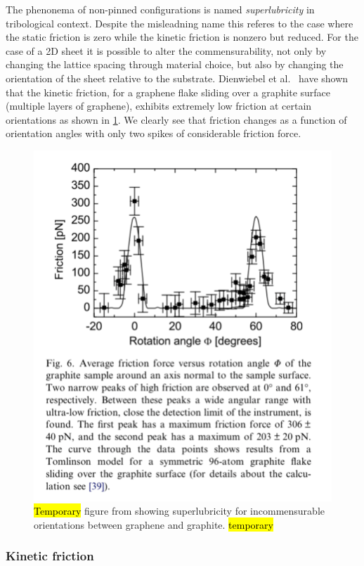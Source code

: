 The phenonema of non-pinned configurations is named \textit{superlubricity} in
tribological context. Despite the misleadning name this referes to the case
where the static friction is zero while the kinetic friction is nonzero but
reduced. For the case of a 2D sheet it is possible to alter the commensurability, not only by changing the lattice spacing through material choice, but also
by changing the orientation of the sheet relative to the substrate. Dienwiebel et al.\ \cite{DIENWIEBEL2005197} have shown that the kinetic friction, for a graphene flake sliding over a graphite surface (multiple layers of graphene), exhibits extremely low friction at certain orientations as shown in \cref{fig:graphene_rot}. We clearly see that friction changes as a function of orientation angles with only two spikes of considerable friction force.

\begin{figure}[H]
  \centering
  \includegraphics[width=0.5\linewidth]{figures/theory/graphene_rot.png}
  \caption{\hl{Temporary} figure from \cite{DIENWIEBEL2005197} showing superlubricity for incommensurable orientations between graphene and graphite. \hl{temporary}}
  \label{fig:graphene_rot}
\end{figure}





\subsubsection{Kinetic friction}



